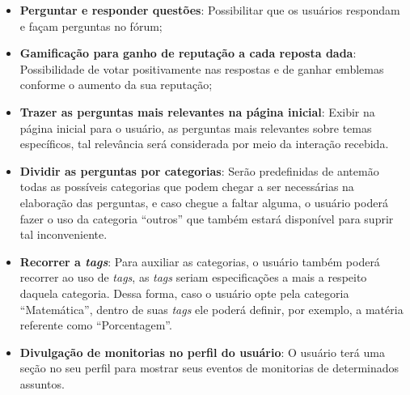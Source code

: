 \begin{itemize}
\item \textbf{Perguntar e responder questões}: Possibilitar que os usuários respondam e façam perguntas no fórum;

\item \textbf{Gamificação para ganho de reputação a cada reposta dada}: Possibilidade de votar positivamente nas respostas e de ganhar emblemas conforme o aumento da sua reputação;

\item \textbf{Trazer as perguntas mais relevantes na página inicial}: Exibir na página inicial para o usuário, as perguntas mais relevantes sobre temas específicos, tal relevância será considerada por meio da interação recebida. 

\item \textbf{Dividir as perguntas por categorias}: Serão predefinidas de antemão todas as possíveis categorias que podem chegar a ser necessárias na elaboração das perguntas, e caso chegue a faltar alguma, o usuário poderá fazer o uso da categoria ``outros'' que também estará disponível para suprir tal inconveniente. 

\item \textbf{Recorrer a \textit{tags}}: Para auxiliar as categorias, o usuário também poderá recorrer ao uso de \textit{tags}, as \textit{tags} seriam especificações a mais a respeito daquela categoria. Dessa forma, caso o usuário opte pela categoria ``Matemática'', dentro de suas \textit{tags} ele poderá definir, por exemplo, a matéria referente como ``Porcentagem''.

\item \textbf{Divulgação de monitorias no perfil do usuário}: O usuário terá uma seção no seu perfil para mostrar seus eventos de monitorias de determinados assuntos.

\end{itemize}


